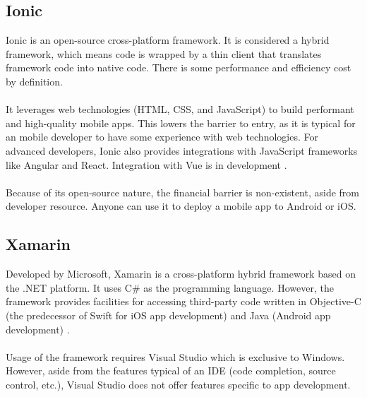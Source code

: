 \documentclass[onecolumn, draftclsnofoot,10pt, compsoc]{IEEEtran}
\begin{document}
\subsection{Ionic}
Ionic is an open-source cross-platform framework. It is considered a hybrid framework, which means code is wrapped by a thin client that translates framework code into native code. There is some performance and efficiency cost by definition.
\\\\
It leverages web technologies (HTML, CSS, and JavaScript) to build performant and high-quality mobile apps. This lowers the barrier to entry, as it is typical for an mobile developer to have some experience with web technologies. For advanced developers, Ionic also provides integrations with JavaScript frameworks like Angular and React. Integration with Vue is in development \cite{ionic}.
\\\\
Because of its open-source nature, the financial barrier is non-existent, aside from developer resource. Anyone can use it to deploy a mobile app to Android or iOS.

\subsection{Xamarin}
Developed by Microsoft, Xamarin is a cross-platform hybrid framework based on the .NET platform.
It uses C\# as the programming language.
However, the framework provides facilities for accessing third-party code written in Objective-C (the predecessor of Swift for iOS app development) and Java (Android app development) \cite{xamarin}.
\\\\
Usage of the framework requires Visual Studio which is exclusive to Windows. However, aside from the features typical of an IDE (code completion, source control, etc.), Visual Studio does not offer features specific to app development.
\end{document}
